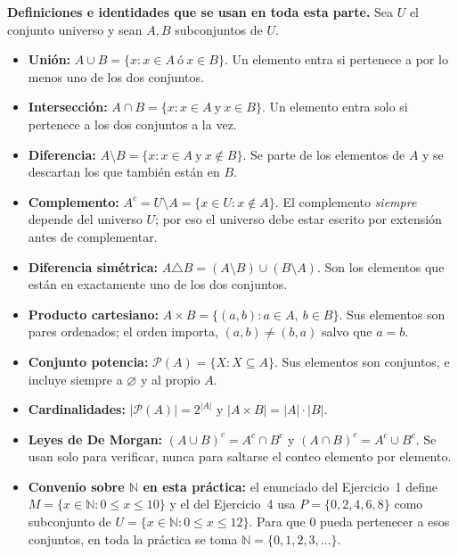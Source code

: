 \documentclass[11pt]{article}
\begin{document}
\begin{tip}
\textbf{Definiciones e identidades que se usan en toda esta parte.}
Sea $U$ el conjunto universo y sean $A,B$ subconjuntos de $U$.

\begin{itemize}[leftmargin=*]
	\item \textbf{Unión:} $A\cup B=\{x: x\in A \ \text{ó}\ x\in B\}$. Un elemento entra si
	pertenece a por lo menos uno de los dos conjuntos.
	\item \textbf{Intersección:} $A\cap B=\{x: x\in A \ \text{y}\ x\in B\}$. Un elemento entra
	solo si pertenece a los dos conjuntos a la vez.
	\item \textbf{Diferencia:} $A\setminus B=\{x: x\in A \ \text{y}\ x\notin B\}$. Se parte de
	los elementos de $A$ y se descartan los que también están en $B$.
	\item \textbf{Complemento:} $A^{c}=U\setminus A=\{x\in U: x\notin A\}$. El complemento
	\emph{siempre} depende del universo $U$; por eso el universo debe estar escrito por
	extensión antes de complementar.
	\item \textbf{Diferencia simétrica:} $A\triangle B=(A\setminus B)\cup(B\setminus A)$. Son
	los elementos que están en exactamente uno de los dos conjuntos.
	\item \textbf{Producto cartesiano:} $A\times B=\{(a,b): a\in A,\ b\in B\}$. Sus elementos
	son pares ordenados; el orden importa, $(a,b)\neq(b,a)$ salvo que $a=b$.
	\item \textbf{Conjunto potencia:} $\mathcal{P}(A)=\{X: X\subseteq A\}$. Sus elementos son
	conjuntos, e incluye siempre a $\varnothing$ y al propio $A$.
	\item \textbf{Cardinalidades:} $|\mathcal{P}(A)|=2^{|A|}$ y $|A\times B|=|A|\cdot|B|$.
	\item \textbf{Leyes de De Morgan:} $(A\cup B)^{c}=A^{c}\cap B^{c}$ y
	$(A\cap B)^{c}=A^{c}\cup B^{c}$. Se usan solo para verificar, nunca para saltarse el
	conteo elemento por elemento.
	\item \textbf{Convenio sobre $\mathbb{N}$ en esta práctica:} el enunciado del Ejercicio~1
	define $M=\{x\in\mathbb{N}: 0\le x\le 10\}$ y el del Ejercicio~4 usa $P=\{0,2,4,6,8\}$
	como subconjunto de $U=\{x\in\mathbb{N}: 0\le x\le 12\}$. Para que $0$ pueda pertenecer a
	esos conjuntos, en toda la práctica se toma $\mathbb{N}=\{0,1,2,3,\dots\}$.
\end{itemize}
\end{tip}

\end{document}
